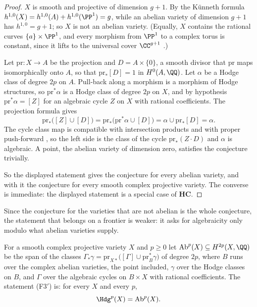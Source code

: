 \begin{proof}
$X$ is smooth and projective of dimension $g+1$. By the K\"unneth formula
$h^{1,0}(X)=h^{1,0}(A)+h^{1,0}(\PP^{1})=g$, while an abelian variety of
dimension $g+1$ has $h^{1,0}=g+1$; so $X$ is not an abelian variety. (Equally,
$X$ contains the rational curves $\{a\}\times\PP^{1}$, and every morphism
from $\PP^{1}$ to a complex torus is constant, since it lifts to the
universal cover $\CC^{g+1}$ \cite[Chapter~1]{BL04}.)

Let $\mathrm{pr}\colon X\to A$ be the projection and $D=A\times\{0\}$, a
smooth divisor that $\mathrm{pr}$ maps isomorphically onto $A$, so that
$\mathrm{pr}_{*}[D]=1$ in $H^{0}(A,\QQ)$. Let $\alpha$ be a Hodge class of
degree $2p$ on $A$. Pull-back along a morphism is a morphism of Hodge
structures, so $\mathrm{pr}^{*}\alpha$ is a Hodge class of degree $2p$ on
$X$, and by hypothesis $\mathrm{pr}^{*}\alpha=[Z]$ for an algebraic cycle
$Z$ on $X$ with rational coefficients. The projection formula gives
\[
  \mathrm{pr}_{*}\bigl([Z]\cup[D]\bigr)
  =\mathrm{pr}_{*}\bigl(\mathrm{pr}^{*}\alpha\cup[D]\bigr)
  =\alpha\cup\mathrm{pr}_{*}[D]=\alpha .
\]
The cycle class map is compatible with intersection products and with proper
push-forward \cite[Chapter~19]{Ful98}, so the left side
is the class of the cycle $\mathrm{pr}_{*}(Z\cdot D)$ and $\alpha$ is
algebraic. A point, the abelian variety of dimension zero, satisfies the
conjecture trivially.

So the displayed statement gives the conjecture for every abelian variety,
and with it the conjecture for every smooth complex projective variety. The
converse is immediate: the displayed statement is a special case of
$\mathbf{HC}$.
\end{proof}

Since the conjecture for the varieties that are not abelian is the whole
conjecture, the statement that belongs on a frontier is weaker: it asks for
algebraicity only modulo what abelian varieties supply.

\begin{definition}
\label{def:f3prime}
For a smooth complex projective variety $X$ and $p\ge0$ let
$\mathrm{Ab}^{p}(X)\subseteq H^{2p}(X,\QQ)$ be the span of the classes
$\Gamma_{*}\gamma=\mathrm{pr}_{X*}\bigl([\Gamma]\cup\mathrm{pr}_{B}^{*}\gamma\bigr)$
of degree $2p$, where $B$ runs over the complex abelian varieties, the point
included, $\gamma$ over the Hodge classes on $B$, and $\Gamma$ over the
algebraic cycles on $B\times X$ with rational coefficients. The statement
\textup{(F3$'$)} is: for every $X$ and every $p$,
\[
  \Hdg^{p}(X)=\mathrm{Ab}^{p}(X).
\]
\end{definition}

